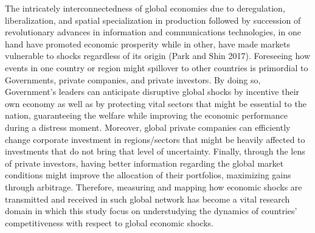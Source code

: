 \documentclass[]{elsarticle} %
\begin{document}
The intricately interconnectedness of global economies due to
deregulation, liberalization, and spatial specialization in production
followed by succession of revolutionary advances in information and
communications technologies, in one hand have promoted economic
prosperity while in other, have made markets vulnerable to shocks
regardless of its origin (Park and Shin 2017). Foreseeing how events in
one country or region might spillover to other countries is primordial
to Governments, private companies, and private investors. By doing so,
Government's leaders can anticipate disruptive global shocks by
incentive their own economy as well as by protecting vital sectors that
might be essential to the nation, guaranteeing the welfare while
improving the economic performance during a distress moment. Moreover,
global private companies can efficiently change corporate investment in
regions/sectors that might be heavily affected to investments that do
not bring that level of uncertainty. Finally, through the lens of
private investors, having better information regarding the global market
conditions might improve the allocation of their portfolios, maximizing
gains through arbitrage. Therefore, measuring and mapping how economic
shocks are transmitted and received in such global network has become a
vital research domain in which this study focus on understudying the
dynamics of countries' competitiveness with respect to global economic
shocks.
\end{document}
